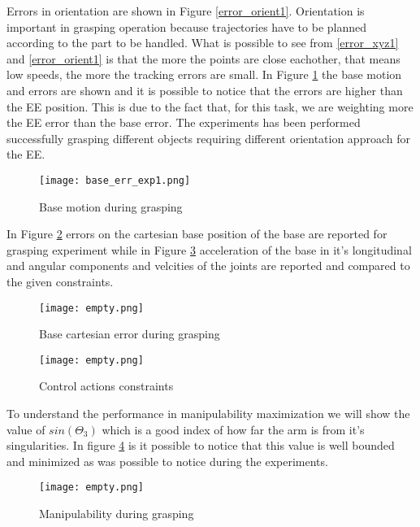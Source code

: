 	Errors in orientation are shown in Figure \ref{error_orient1}. Orientation is important in grasping operation because trajectories have to be planned according to the part to be handled. What is possible to see from \ref{error_xyz1} and \ref{error_orient1} is that the more the points are close eachother, that means low speeds, the more the tracking errors are small. In Figure \ref{base_err_exp1} the base motion and errors are shown and it is possible to notice that the errors are higher than the EE position. This is due to the fact that, for this task, we are weighting more the EE error than the base error.
	The experiments has been performed successfully grasping different objects requiring different orientation approach for the EE.  
	\begin{figure}[h!]
	\centering
	\texttt{[image: base\_err\_exp1.png]}
	\caption{Base motion during grasping}
	\label{base_err_exp1}
	\end{figure}
	In Figure \ref{err_num_base} errors on the cartesian base position of the base are reported for grasping experiment while in Figure \ref{vel_real} acceleration of the base in it's longitudinal and angular components and velcities of the joints are reported and compared to the given constraints.
	\begin{figure}[h!]
	\centering
	\texttt{[image: empty.png]}
	\caption{Base cartesian error during grasping}
	\label{err_num_base}
	\end{figure}
	\begin{figure}[h!]
	\centering
	\texttt{[image: empty.png]}
	\caption{Control actions constraints}
	\label{vel_real}
	\end{figure}
	To understand the performance in manipulability maximization we will show the value of $sin(\Theta_3)$ which is a good index of how far the arm is from it's singularities. In figure \ref{man_real1} is it possible to notice that this value is well bounded and minimized as was possible to notice during the experiments.
	\begin{figure}[h!]
	\centering
	\texttt{[image: empty.png]}
	\caption{Manipulability during grasping}
	\label{man_real1}
	\end{figure}

